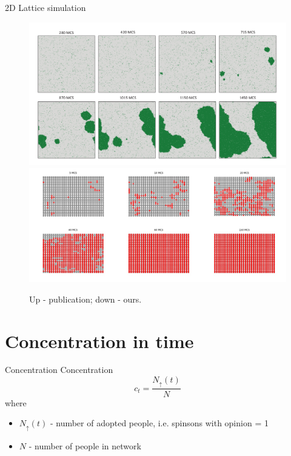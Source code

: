 \documentclass[10pt]{beamer}
\begin{document}
\begin{frame}{2D Lattice simulation}
	\begin{figure}
		\includegraphics[height=0.4\textheight]{../resources/images/fig6.png}
		\vfill
		\includegraphics[height=0.4\textheight]{../results/images/snapshots.png}
		\caption{Up - publication; down - ours.}
	\end{figure}
\end{frame}

\section{Concentration in time}

\begin{frame}{Concentration}
	Concentration
	$$ c_t = \frac{N_{\uparrow}(t)}{N} $$ 
	where 
	\begin{itemize}
		\item $ N_{\uparrow}(t) $ - number of adopted people, i.e. spinsons with opinion = 1
		\item $ N $ - number of people in network
	\end{itemize}

\end{frame}
\end{document}

